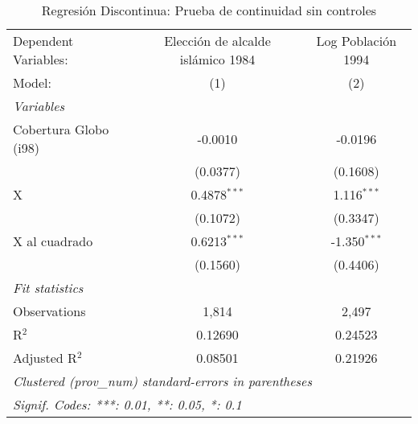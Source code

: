 \begin{table}[htbp]
   \caption{Regresión Discontinua: Prueba de continuidad sin controles}
   \centering
   \begin{tabular}{lcc}
      \tabularnewline \midrule \midrule
      Dependent Variables:  & Elección de alcalde islámico 1984 & Log Población 1994\\  
      Model:                & (1)                               & (2)\\  
      \midrule
      \emph{Variables}\\
      Cobertura Globo (i98) & -0.0010                           & -0.0196\\   
                            & (0.0377)                          & (0.1608)\\   
      X                     & 0.4878$^{***}$                    & 1.116$^{***}$\\   
                            & (0.1072)                          & (0.3347)\\   
      X al cuadrado         & 0.6213$^{***}$                    & -1.350$^{***}$\\   
                            & (0.1560)                          & (0.4406)\\   
      \midrule
      \emph{Fit statistics}\\
      Observations          & 1,814                             & 2,497\\  
      R$^2$                 & 0.12690                           & 0.24523\\  
      Adjusted R$^2$        & 0.08501                           & 0.21926\\  
      \midrule \midrule
      \multicolumn{3}{l}{\emph{Clustered (prov\_num) standard-errors in parentheses}}\\
      \multicolumn{3}{l}{\emph{Signif. Codes: ***: 0.01, **: 0.05, *: 0.1}}\\
   \end{tabular}
\end{table}


